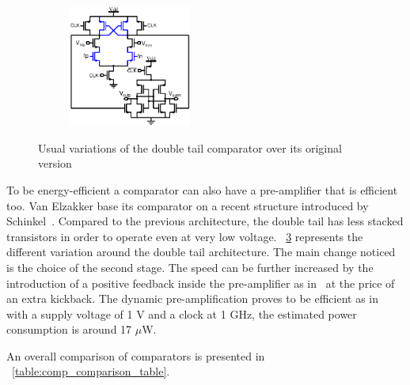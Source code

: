 \begin{figure}[htp]
\begin{subfigure}[b]{0.48\textwidth}
        \label{fig:dbl_tail_chan}
    \end{subfigure}
    \begin{subfigure}[b]{0.48\textwidth}
        \centering
        \includegraphics[height=4cm]{Chapter7/Figs/dbl_tail_babayan.ps}
        \label{fig:dbl_tail_babayan}
    \end{subfigure}
	\caption{Usual variations of the double tail comparator over its original version}
	\label{fig:dbl_tail_comp}
\end{figure}

To be energy-efficient a comparator can also have a pre-amplifier that is efficient too. Van Elzakker base its comparator on a recent structure introduced by Schinkel~\cite{Schinkel2007, Elzakker2010}. Compared to the previous architecture, the double tail has less stacked transistors in order to operate even at very low voltage. \figurename~\ref{fig:dbl_tail_comp} represents the different variation around the double tail architecture. The main change noticed is the choice of the second stage. The speed can be further increased by the introduction of a positive feedback inside the pre-amplifier as in~\cite{Bult1997,Babayan2014} at the price of an extra kickback. The dynamic pre-amplification proves to be efficient as in~\cite{Savani2015} with a supply voltage of 1 V and a clock at 1 GHz, the estimated power consumption is around 17 \(\mu \)W.

An overall comparison of comparators is presented in \tablename~\ref{table:comp_comparison_table}.

